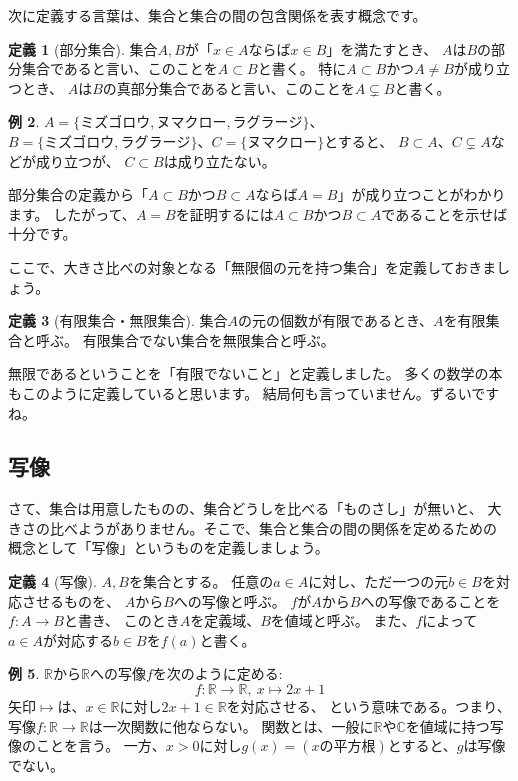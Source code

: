 \documentclass[./main]{subfiles} %
\theoremstyle{definition}
\newtheorem{defi}{定義}[section]
\newtheorem{ex}[defi]{例}
\begin{document}
次に定義する言葉は、集合と集合の間の包含関係を表す概念です。

\begin{defi}[部分集合]
集合$A,B$が「$x\in A$ならば$x\in B$」を満たすとき、
$A$は$B$の部分集合であると言い、このことを$A\subset B$と書く。
特に$A\subset B$かつ$A\neq B$が成り立つとき、
$A$は$B$の真部分集合であると言い、このことを$A\subsetneq B$と書く。
\end{defi}

\begin{ex}
$A=\{ミズゴロウ, ヌマクロー, ラグラージ\}$、
$B=\{ミズゴロウ, ラグラージ\}$、$C=\{ヌマクロー\}$とすると、
$B\subset A$、$C\subsetneq A$などが成り立つが、
$C\subset B$は成り立たない。
\end{ex}

部分集合の定義から「$A\subset B$かつ$B\subset A$ならば$A=B$」が成り立つことがわかります。
したがって、$A=B$を証明するには$A\subset B$かつ$B\subset A$であることを示せば
十分です。

ここで、大きさ比べの対象となる「無限個の元を持つ集合」を定義しておきましょう。

\begin{defi}[有限集合・無限集合]
集合$A$の元の個数が有限であるとき、$A$を有限集合と呼ぶ。
有限集合でない集合を無限集合と呼ぶ。
\end{defi}

無限であるということを「有限でないこと」と定義しました。
多くの数学の本もこのように定義していると思います。
{\footnotesize 結局何も言っていません。ずるいですね。}

\subsection{写像}
さて、集合は用意したものの、集合どうしを比べる「ものさし」が無いと、
大きさの比べようがありません。そこで、集合と集合の間の関係を定めるための
概念として「写像」というものを定義しましょう。

\begin{defi}[写像]
\label{map}
$A,B$を集合とする。
任意の$a\in A$に対し、ただ一つの元$b\in B$を対応させるものを、
$A$から$B$への写像と呼ぶ。
$f$が$A$から$B$への写像であることを$f\colon A\to B$と書き、
このとき$A$を定義域、$B$を値域と呼ぶ。
また、$f$によって$a\in A$が対応する$b\in B$を$f(a)$と書く。
\end{defi}

\begin{ex}
\label{mapex}
$\mathbb{R}$から$\mathbb{R}$への写像$f$を次のように定める:
\[
f\colon\mathbb{R}\to\mathbb{R},\ x\mapsto 2x+1
\]
矢印$\mapsto$は、$x\in\mathbb{R}$に対し$2x+1\in\mathbb{R}$を対応させる、
という意味である。つまり、写像$f\colon\mathbb{R}\to\mathbb{R}$は一次関数に他ならない。
関数とは、一般に$\mathbb{R}$や$\mathbb{C}$を値域に持つ写像のことを言う。
一方、$x>0$に対し$g(x)=(xの平方根)$とすると、$g$は写像でない。
\end{ex}
\end{document}
